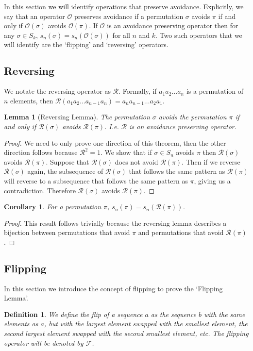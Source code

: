 \documentclass[11pt,letterpaper,twoside,english]{article}
\theoremstyle{theorem}
\newtheorem{corollary}[theorem]{Corollary}
\newtheorem{lemma}[theorem]{Lemma}
\newtheorem{definition}[theorem]{Definition}
\theoremstyle{remark}
\begin{document}
In this section we will identify operations that preserve avoidance. Explicitly, we say that an operator $\mathcal{O}$ preserves avoidance if a permutation $\sigma$ avoids $\pi$ if and only if $\mathcal{O}(\sigma)$ avoids $\mathcal{O}(\pi)$. If $\mathcal{O}$ is an avoidance preserving operator then for any $\sigma\in S_k$, $s_n(\sigma)=s_n(\mathcal{O}(\sigma))$ for all $n$ and $k$. Two such operators that we will identify are the `flipping' and `reversing' operators.  

\subsection{Reversing}

We notate the reversing operator as $\mathcal{R}$. Formally, if $a_1 a_2 \ldots a_n$ is a permutation of $n$ elements, then $\mathcal{R}(a_1 a_2 \ldots a_{n-1} a_n) = a_n a_{n-1} \dots a_2 a_1$.

\begin{lemma}[Reversing Lemma]
The permutation $\sigma$ avoids the permutation $\pi$ if and only if $\mathcal{R}(\sigma)$ avoids $\mathcal{R}(\pi)$. I.e. $\mathcal{R}$ is an avoidance preserving operator. 
\end{lemma}
\begin{proof}
We need to only prove one direction of this theorem, then the other direction follows because $\mathcal{R}^2=1$. We show that if ${\sigma}\in S_n$ avoids $\pi$ then $\mathcal{R}(\sigma)$ avoids $\mathcal{R}(\pi)$. Suppose that $\mathcal{R}(\sigma)$ does not avoid $\mathcal{R}(\pi)$. Then if we reverse $\mathcal{R}(\sigma)$ again, the subsequence of $\mathcal{R}(\sigma)$ that follows the same pattern as $\mathcal{R}(\pi)$ will reverse to a subsequence that follows the same pattern as $\pi$, giving us a contradiction. Therefore $\mathcal{R}(\sigma)$ avoids $\mathcal{R}(\pi)$. 

\end{proof}

\begin{corollary} 
For a permutation $\pi$, $s_n(\pi)=s_n(\mathcal{R}(\pi))$. 
\end{corollary}
\begin{proof}
This result follows trivially because the reversing lemma describes a bijection between permutations that avoid $\pi$ and permutations that avoid $\mathcal{R}(\pi)$. 
\end{proof}

\subsection{Flipping}
In this section we introduce the concept of flipping to prove the `Flipping Lemma'.
\begin{definition}
We define the \emph{flip} of a sequence $a$ as the sequence $b$ with the same elements as $a$, but with the largest element swapped with the smallest element, the second largest element swapped with the second smallest element, etc.  The flipping operator will be denoted by $\mathcal{F}$.  
\end{definition}
\end{document}
